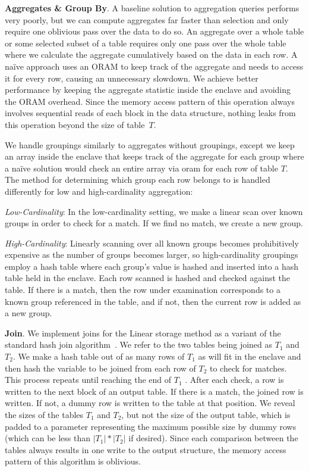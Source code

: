 \documentclass[letterpaper,twocolumn,10pt]{article}
\begin{document}
  \noindent \textbf{Aggregates \& Group By}.
A baseline solution to aggregation queries performs very poorly, but we can compute aggregates far faster than selection and only require one oblivious pass over the data to do so.  An aggregate over a whole table or some selected subset of a table requires only one pass over the whole table where we calculate the aggregate cumulatively based on the data in each row. A na\"ive approach uses an ORAM to keep track of the aggregate and needs to access it for every row, causing an unnecessary slowdown. We achieve better performance by keeping the aggregate statistic inside the enclave and avoiding the ORAM overhead. Since the memory access pattern of this operation always involves sequential reads of each block in the data structure, nothing leaks from this operation beyond the size of table~$T$.

We handle groupings similarly to aggregates without groupings, except we keep an array inside the enclave that keeps track of the aggregate for each group where a na\"ive solution would check an entire array via oram for each row of table $T$. The method for determining which group each row belongs to is handled differently for low and high-cardinality aggregation:

\textit{Low-Cardinality}: In the low-cardinality setting, we make a linear scan over known groups in order to check for a match. If we find no match, we create a new group.

\textit{High-Cardinality}: Linearly scanning over all known groups becomes prohibitively expensive as the number of groups becomes larger, so high-cardinality groupings employ a hash table where each group's value is hashed and inserted into a hash table held in the enclave. Each row scanned is hashed and checked against the table. If there is a match, then the row under examination corresponds to a known group referenced in the table, and if not, then the current row is added as a new group.


  \noindent \textbf{Join}.
We implement joins for the Linear storage method as a variant of the standard hash join algorithm~\cite{EN10}. We refer to the two tables being joined as $T_1$ and $T_2$. We make a hash table out of as many rows of $T_1$ as will fit in the enclave and then hash the variable to be joined from each row of $T_2$ to check for matches. This process repeats until reaching the end of $T_1$ . After each check, a row is written to the next block of an output table. If there is a match, the joined row is written. If not, a dummy row is written to the table at that position. We reveal the sizes of the tables $T_1$ and $T_2$, but not the size of the output table, which is padded to a parameter representing the maximum possible size by dummy rows (which can be less than $|T_1|*|T_2|$ if desired). Since each comparison between the tables always results in one write to the output structure, the memory access pattern of this algorithm is oblivious.
\end{document}
